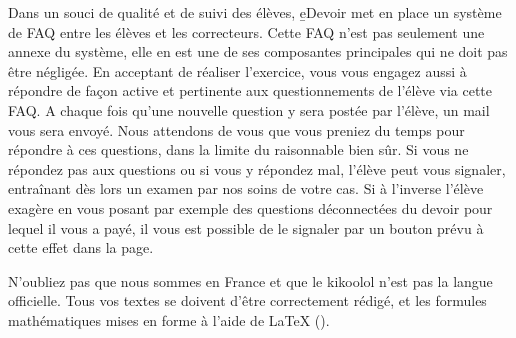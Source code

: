 ﻿Dans un souci de qualité et de suivi des élèves, \b{eDevoir} met en place un système de FAQ entre les élèves et les correcteurs. Cette FAQ n'est pas seulement une annexe du système, elle en est une de ses composantes principales qui ne doit pas être négligée.
En acceptant de réaliser l'exercice, vous vous engagez aussi à répondre de façon active et pertinente aux questionnements de l'élève via cette FAQ. A chaque fois qu'une nouvelle question y sera postée par l'élève, un mail vous sera envoyé. Nous attendons de vous que vous preniez du temps pour répondre à ces questions, dans la limite du raisonnable bien sûr.
Si vous ne répondez pas aux questions ou si vous y répondez mal, l'élève peut vous signaler, entraînant dès lors un examen par nos soins de votre cas. Si à l'inverse l'élève exagère en vous posant par exemple des questions déconnectées du devoir pour lequel il vous a payé, il vous est possible de le signaler par un bouton prévu à cette effet dans la page.

N'oubliez pas que nous sommes en France et que le kikoolol n'est pas la langue officielle. Tous vos textes se doivent d'être correctement rédigé, et les formules mathématiques mises en forme à l'aide de LaTeX ().